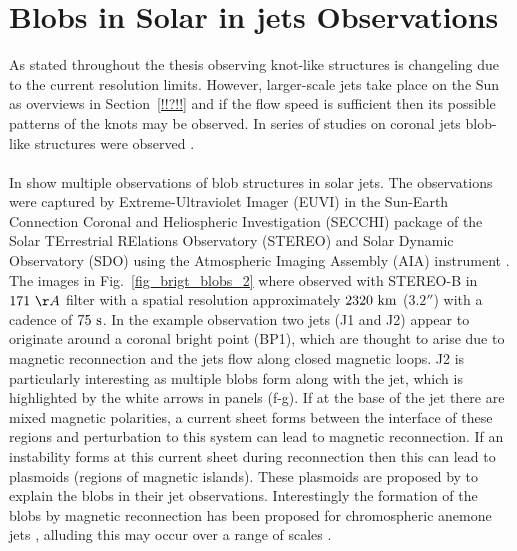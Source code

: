 \documentclass[12pt]{ociamthesis}
\newcommand{\np}{\\ \\}
\begin{document}
\section{Blobs in Solar in jets Observations}
\label{sec:EUV_jets}
As stated throughout the thesis observing knot-like structures is changeling due to the current resolution limits. However, larger-scale jets take place on the Sun as overviews in Section~\ref{!!?!!} and if the flow speed is sufficient then its possible patterns of the knots may be observed. In series of studies on coronal jets blob-like structures were observed \citep{Zhang2014AA567A11Z, Zhang2016SoPh291859Z, Chen2015ApJ81571C, Chen2017ApJ84054C}.  \np
%
In \cite{Zhang2016SoPh291859Z} show multiple observations of blob structures in solar jets. The observations were captured by Extreme-Ultraviolet Imager (EUVI) in the Sun-Earth Connection Coronal and Heliospheric Investigation (SECCHI) \citep{Howard2008SSRv13667H} package of the Solar TErrestrial RElations Observatory (STEREO) \citep{Kaiser2005AdSpR361483K} and Solar Dynamic Observatory (SDO) using the Atmospheric Imaging Assembly (AIA) instrument \citep{Lemen2012SoPh27517L}. The images in Fig.~\ref{fig_brigt_blobs_2} where observed with STEREO-B in $171~\AA$ filter with a spatial resolution approximately $2320~\rm{km}$ ($\ang{;;3.2}$) with a cadence of $75~\rm{s}$. In the example observation two jets (J1 and J2) appear to originate around a coronal bright point (BP1), which are thought to arise due to magnetic reconnection \citep{Priest1994ApJ427459P, Mandrini1996SoPh168115M, Longcope1998ApJ507433L, Santos2007ASTRA329S} and the jets flow along closed magnetic loops. J2 is particularly interesting as multiple blobs form along with the jet, which is highlighted by the white arrows in panels (f-g). If at the base of the jet there are mixed magnetic polarities, a current sheet forms between the interface of these regions and perturbation to this system can lead to magnetic reconnection. If an instability forms at this current sheet during reconnection then this can lead to plasmoids (regions of magnetic islands)\citep{Drake2006Natur443553D}. These plasmoids are proposed by \cite{Zhang2016SoPh291859Z} to explain the blobs in their jet observations. Interestingly the formation of the blobs by magnetic reconnection has been proposed for chromospheric anemone jets \citep{Singh2012ApJ75933S}, alluding this may occur over a range of scales \citep{Zhang2016SoPh291859Z}. \np 
\end{document}
